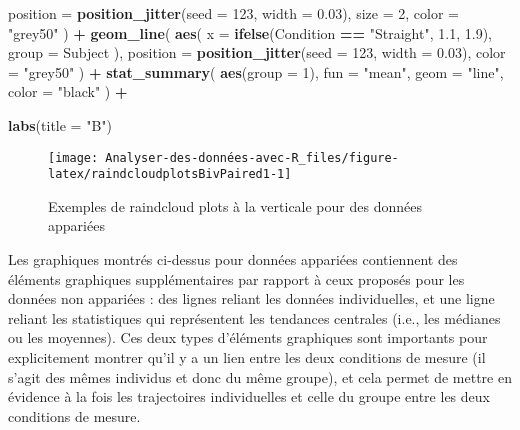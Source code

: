 \documentclass[
  french,
]{book}
\newenvironment{Shaded}{\begin{snugshade}}{\end{snugshade}}
\newcommand{\DataTypeTok}[1]{\textcolor[rgb]{0.13,0.29,0.53}{#1}}
\newcommand{\DecValTok}[1]{\textcolor[rgb]{0.00,0.00,0.81}{#1}}
\newcommand{\FloatTok}[1]{\textcolor[rgb]{0.00,0.00,0.81}{#1}}
\newcommand{\KeywordTok}[1]{\textcolor[rgb]{0.13,0.29,0.53}{\textbf{#1}}}
\newcommand{\NormalTok}[1]{#1}
\newcommand{\OperatorTok}[1]{\textcolor[rgb]{0.81,0.36,0.00}{\textbf{#1}}}
\newcommand{\StringTok}[1]{\textcolor[rgb]{0.31,0.60,0.02}{#1}}
\begin{document}
\begin{Shaded}
\begin{Highlighting}[]
    \DataTypeTok{position =} \KeywordTok{position_jitter}\NormalTok{(}\DataTypeTok{seed =} \DecValTok{123}\NormalTok{, }\DataTypeTok{width =} \FloatTok{0.03}\NormalTok{),}
    \DataTypeTok{size =} \DecValTok{2}\NormalTok{,}
    \DataTypeTok{color =} \StringTok{"grey50"}
\NormalTok{  ) }\OperatorTok{+}
\StringTok{  }\KeywordTok{geom_line}\NormalTok{(}
    \KeywordTok{aes}\NormalTok{(}
      \DataTypeTok{x =} \KeywordTok{ifelse}\NormalTok{(Condition }\OperatorTok{==}\StringTok{ "Straight"}\NormalTok{, }\FloatTok{1.1}\NormalTok{, }\FloatTok{1.9}\NormalTok{),}
      \DataTypeTok{group =}\NormalTok{ Subject}
\NormalTok{      ),}
    \DataTypeTok{position =} \KeywordTok{position_jitter}\NormalTok{(}\DataTypeTok{seed =} \DecValTok{123}\NormalTok{, }\DataTypeTok{width =} \FloatTok{0.03}\NormalTok{),}
    \DataTypeTok{color =} \StringTok{"grey50"}
\NormalTok{  ) }\OperatorTok{+}
\StringTok{  }\KeywordTok{stat_summary}\NormalTok{(}
    \KeywordTok{aes}\NormalTok{(}\DataTypeTok{group =} \DecValTok{1}\NormalTok{),}
    \DataTypeTok{fun =} \StringTok{"mean"}\NormalTok{,}
    \DataTypeTok{geom =} \StringTok{"line"}\NormalTok{,}
    \DataTypeTok{color =} \StringTok{"black"}
\NormalTok{  ) }\OperatorTok{+}

\StringTok{  }\KeywordTok{labs}\NormalTok{(}\DataTypeTok{title =} \StringTok{"B"}\NormalTok{)}
\end{Highlighting}
\end{Shaded}

\begin{figure}

{\centering \texttt{[image: Analyser-des-données-avec-R\_files/figure-latex/raindcloudplotsBivPaired1-1]} 

}

\caption{Exemples de raindcloud plots à la verticale pour des données appariées}\label{fig:raindcloudplotsBivPaired1}
\end{figure}

Les graphiques montrés ci-dessus pour données appariées contiennent des éléments graphiques supplémentaires par rapport à ceux proposés pour les données non appariées : des lignes reliant les données individuelles, et une ligne reliant les statistiques qui représentent les tendances centrales (i.e., les médianes ou les moyennes). Ces deux types d'éléments graphiques sont importants pour explicitement montrer qu'il y a un lien entre les deux conditions de mesure (il s'agit des mêmes individus et donc du même groupe), et cela permet de mettre en évidence à la fois les trajectoires individuelles et celle du groupe entre les deux conditions de mesure.
\end{document}
